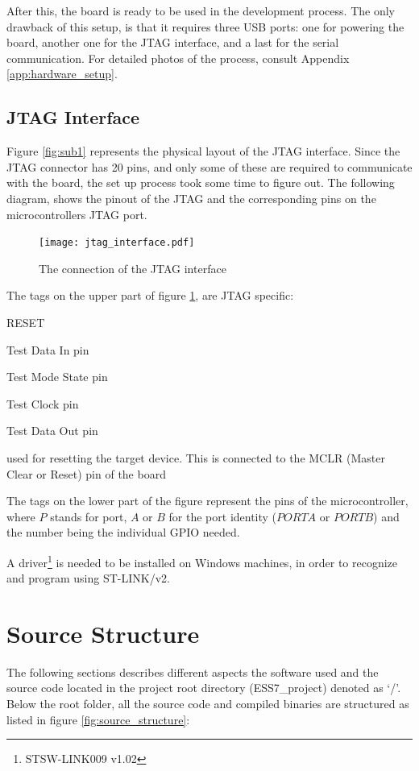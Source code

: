 After this, the board is ready to be used in the development process.
The only drawback of this setup, is that it requires three USB ports:
one for powering the board, another one for the JTAG interface, and a last
for the serial communication. For detailed photos of the process, consult
Appendix \ref{app:hardware_setup}.

\subsection{JTAG Interface}
\label{ssec:JTAG_Interface}
Figure \ref{fig:sub1} represents the physical layout of the JTAG interface.
Since the JTAG connector has 20 pins, and only some of these are required
to communicate with the board, the set up process took some time to figure
out. The following diagram, shows the pinout of the JTAG and the
corresponding pins on the microcontroller\textquotesingle s JTAG port.

\begin{figure}[H]
\centering
\texttt{[image: jtag\_interface.pdf]}
\caption{The connection of the JTAG interface}
\label{fig:jtag_interface}
\end{figure}

The tags on the upper part of figure \ref{fig:jtag_interface}, are
JTAG specific:
\begin{labeling}{RESET}
	\item [\textbf{TDI}]
		Test Data In pin
	\item [\textbf{TMS}]
		Test Mode State pin
	\item [\textbf{TCK}]
		Test Clock pin
	\item [\textbf{TDO}]
		Test Data Out pin
	\item [\textbf{RESET}]
		used for resetting the target device. This is connected to the
		MCLR (Master Clear or Reset) pin of the board
\end{labeling}

The tags on the lower part of the figure represent the pins of the
microcontroller, where $P$ stands for port, $A$ or $B$ for the port
identity ($PORTA$ or $PORTB$) and the number being the individual GPIO needed.

A driver\footnote{STSW-LINK009 v1.02}
is needed to be installed on Windows machines, in order to
recognize and program using ST-LINK/v2.

\section{Source Structure}
The following sections describes different aspects the software used and
the source code located in the project root directory (ESS7\_project) denoted as `/'.
Below the root folder,
all the source code and compiled binaries are structured as listed
in figure \ref{fig:source_structure}:

